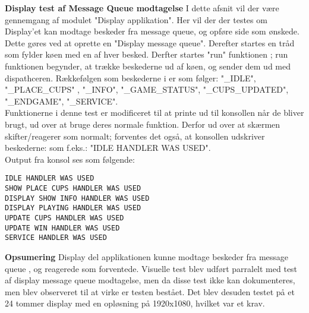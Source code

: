 \documentclass[Modultest/Modultest_main.tex]{subfiles}
\begin{document}
\textbf{Display test af Message Queue modtagelse}\label{sec:GUI_modultest_doc}
I dette afsnit vil der være gennemgang af modulet "Display applikation". Her vil der der testes om Display'et kan modtage beskeder fra message queue, og opføre side som ønskede.
\\
Dette gøres ved at oprette en "Display message queue".  Derefter startes en tråd som fylder køen med en af hver besked. Derfter  startes "run" funktionen ; run funktionen begynder,  at trække beskederne ud af køen, og sender dem ud med dispathceren. 
Rækkefølgen som beskederne i er som følger:  "\_IDLE",  "\_PLACE\_CUPS" , "\_INFO", "\_GAME\_STATUS",  "\_CUPS\_UPDATED", "\_ENDGAME", "\_SERVICE". 
\\
Funktionerne i denne test er modificeret til at printe ud til konsollen når de bliver brugt, ud over at bruge deres normale funktion.  Derfor ud over at skærmen skifter/reagerer som normalt;  forventes det også, at konsollen udskriver beskederne: som f.eks.: "IDLE HANDLER WAS USED". 
\\ 
Output fra konsol ses som følgende: 
\begin{verbatim}
IDLE HANDLER WAS USED
SHOW PLACE CUPS HANDLER WAS USED
DISPLAY SHOW INFO HANDLER WAS USED
DISPLAY PLAYING HANDLER WAS USED
UPDATE CUPS HANDLER WAS USED
UPDATE WIN HANDLER WAS USED
SERVICE HANDLER WAS USED 
\end{verbatim}



\textbf{Opsumering}
Display del applikationen kunne modtage beskeder fra message queue , og reagerede som forventede. Visuelle test blev udført parralelt med test af display message queue modtagelse, men da disse test ikke kan dokumenteres, men blev observeret til at virke er testen bestået.  Det blev desuden testet på et 24 tommer display med en opløsning på 1920x1080, hvilket var et krav. 
\end{document}
